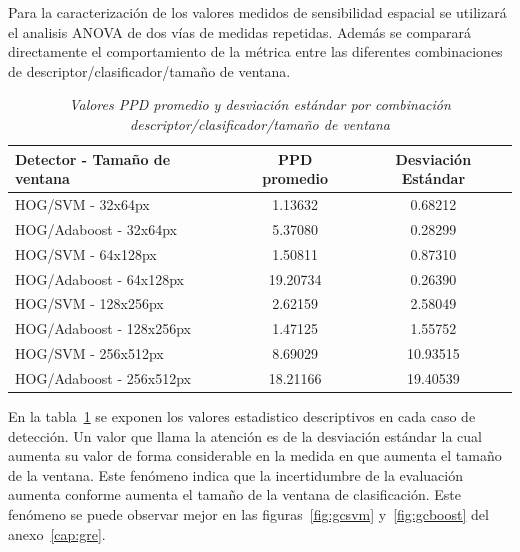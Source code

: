 Para la caracterización de los valores medidos de sensibilidad espacial se utilizará el analisis ANOVA de dos vías de medidas repetidas. Además se comparará directamente el comportamiento de la métrica entre las diferentes combinaciones de descriptor/clasificador/tamaño de ventana.


\begin{table}[htc]
\centering
\caption{\em  Valores PPD promedio y desviación estándar por combinación \\ descriptor/clasificador/tamaño de ventana}  \label{tab:promgeneral}
\resizebox{15cm}{!} {
\begin{tabular}{|l|c|c|}
\hline
\rowcolor[HTML]{9B9B9B} 
Detector - Tamaño de ventana & PPD promedio & Desviación Estándar \\ \hline
HOG/SVM - 32x64px            & 1.13632      & 0.68212             \\ \hline
\rowcolor[HTML]{C0C0C0} 
HOG/Adaboost - 32x64px       & 5.37080      & 0.28299             \\ \hline
HOG/SVM - 64x128px           & 1.50811      & 0.87310             \\ \hline
\rowcolor[HTML]{C0C0C0} 
HOG/Adaboost - 64x128px      & 19.20734     & 0.26390             \\ \hline
HOG/SVM - 128x256px          & 2.62159      & 2.58049             \\ \hline
\rowcolor[HTML]{C0C0C0} 
HOG/Adaboost - 128x256px     & 1.47125      & 1.55752             \\ \hline
HOG/SVM - 256x512px          & 8.69029      & 10.93515            \\ \hline
\rowcolor[HTML]{C0C0C0} 
HOG/Adaboost - 256x512px     & 18.21166     & 19.40539            \\ \hline
\end{tabular}}
\end{table}


En la tabla~\ref{tab:promgeneral} se exponen los valores estadistico descriptivos en cada caso de detección. Un valor que llama la atención es de la desviación estándar la cual aumenta su valor de forma considerable en la medida en que aumenta el tamaño de la ventana. Este fenómeno indica que la incertidumbre de la evaluación aumenta conforme aumenta el tamaño de la ventana de clasificación. Este fenómeno se puede observar mejor en las figuras~\ref{fig:gcsvm} y~\ref{fig:gcboost} del anexo~\ref{cap:gre}.


